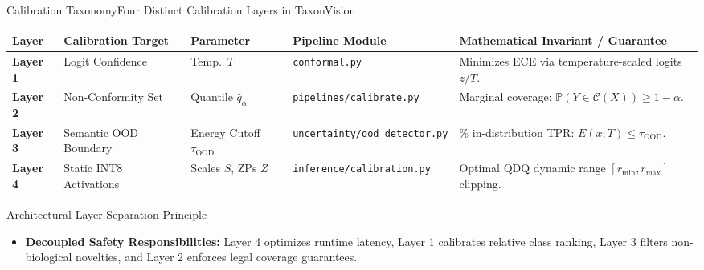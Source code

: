 \begin{frame}{Calibration Taxonomy}{Four Distinct Calibration Layers in TaxonVision}
    \vspace{-0.25cm}
    \begin{center}\scriptsize\renewcommand{\arraystretch}{0.95}
        \begin{tabular}{>{\raggedright\arraybackslash}p{1.2cm} >{\raggedright\arraybackslash}p{2.1cm} >{\raggedright\arraybackslash}p{1.6cm} >{\raggedright\arraybackslash}p{2.5cm} >{\raggedright\arraybackslash}p{3.8cm}}
            \toprule
            \textbf{Layer} & \textbf{Calibration Target} & \textbf{Parameter} & \textbf{Pipeline Module} & \textbf{Mathematical Invariant / Guarantee} \\
            \midrule
            \textbf{Layer 1} & Logit Confidence & Temp.\ $T$ & \texttt{conformal.py} & Minimizes ECE via temperature-scaled logits $z/T$. \\
            \midrule
            \textbf{Layer 2} & Non-Conformity Set & Quantile $\hat{q}_\alpha$ & \texttt{pipelines/}\newline\texttt{calibrate.py} & Marginal coverage: $\mathbb{P}(Y \in \mathcal{C}(X)) \ge 1 - \alpha$. \\
            \midrule
            \textbf{Layer 3} & Semantic OOD Boundary & Energy Cutoff $\tau_{\text{OOD}}$ & \texttt{uncertainty/}\newline\texttt{ood\_detector.py} & 95\% in-distribution TPR: $E(x; T) \le \tau_{\text{OOD}}$. \\
            \midrule
            \textbf{Layer 4} & Static INT8 Activations & Scales $S$, ZPs $Z$ & \texttt{inference/}\newline\texttt{calibration.py} & Optimal QDQ dynamic range $[r_{\min}, r_{\max}]$ clipping. \\
            \bottomrule
        \end{tabular}
    \end{center}
    \vspace{-0.15cm}
    \begin{block}{Architectural Layer Separation Principle}
        \begin{itemize}\scriptsize
            \item \textbf{Decoupled Safety Responsibilities:} Layer 4 optimizes runtime latency, Layer 1 calibrates relative class ranking, Layer 3 filters non-biological novelties, and Layer 2 enforces legal coverage guarantees.
        \end{itemize}
    \end{block}
\end{frame}

